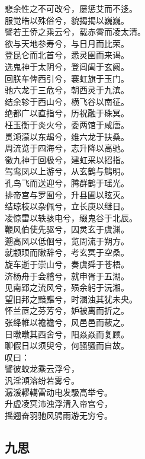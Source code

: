 \documentclass[]{article}
\begin{document}
悲余性之不可改兮，屡惩艾而不迻。\\
服觉皓以殊俗兮，貌揭揭以巍巍。\\
譬若王侨之乘云兮，载赤霄而凌太清。\\
欲与天地参寿兮，与日月而比荣。\\
登昆仑而北首兮，悉灵圉而来谒。\\
选鬼神于太阴兮，登阊阖于玄阙。\\
回朕车俾西引兮，褰虹旗于玉门。\\
驰六龙于三危兮，朝西灵于九滨。\\
结余轸于西山兮，横飞谷以南征。\\
绝都广以直指兮，历祝融于硃冥。\\
枉玉衡于炎火兮，委两馆于咸唐。\\
贯澒濛以东朅兮，维六龙于扶桑。\\
周流览于四海兮，志升降以高驰。\\
徵九神于回极兮，建虹采以招指。\\
驾鸾凤以上游兮，从玄鹤与鹪明。\\
孔鸟飞而送迎兮，腾群鹤于瑶光。\\
排帝宫与罗囿兮，升县圃以眩灭。\\
结琼枝以杂佩兮，立长庚以继日。\\
凌惊雷以轶骇电兮，缀鬼谷于北辰。\\
鞭风伯使先驱兮，囚灵玄于虞渊。\\
遡高风以低佪兮，览周流于朔方。\\
就颛顼而敶辞兮，考玄冥于空桑。\\
旋车逝于崇山兮，奏虞舜于苍梧。\\
济杨舟于会稽兮，就申胥于五湖。\\
见南郢之流风兮，殒余躬于沅湘。\\
望旧邦之黯黮兮，时溷浊其犹未央。\\
怀兰茝之芬芳兮，妒被离而折之。\\
张绛帷以襜襜兮，风邑邑而蔽之。\\
日暾暾其西舍兮，阳焱焱而复顾。\\
聊假日以须臾兮，何骚骚而自故。\\
叹曰：\\
譬彼蛟龙乘云浮兮，\\
汎淫澒溶纷若雾兮。\\
潺湲轇轕雷动电发馺高举兮。\\
升虚凌冥沛浊浮清入帝宫兮，\\
摇翘奋羽驰风骋雨游无穷兮。

\hypertarget{header-n3126}{%
\subsection{九思}\label{header-n3126}}
\end{document}
